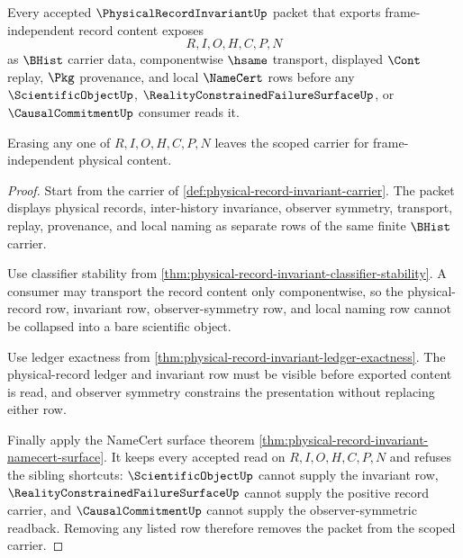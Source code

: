 \begin{theorem}
\label{thm:physical-record-invariant-kernel-scope}
Every accepted $\PhysicalRecordInvariantUp$ packet that exports frame-independent record content exposes
$$
R,I,O,H,C,P,N
$$
as $\BHist$ carrier data, componentwise $\hsame$ transport, displayed $\Cont$ replay, $\Pkg$ provenance, and local $\NameCert$ rows before any $\ScientificObjectUp$, $\RealityConstrainedFailureSurfaceUp$, or $\CausalCommitmentUp$ consumer reads it.

Erasing any one of $R,I,O,H,C,P,N$ leaves the scoped carrier for frame-independent physical content.
\end{theorem}
\begin{proof}
Start from the carrier of \autoref{def:physical-record-invariant-carrier}. The packet displays physical records, inter-history invariance, observer symmetry, transport, replay, provenance, and local naming as separate rows of the same finite $\BHist$ carrier.

Use classifier stability from \autoref{thm:physical-record-invariant-classifier-stability}. A consumer may transport the record content only componentwise, so the physical-record row, invariant row, observer-symmetry row, and local naming row cannot be collapsed into a bare scientific object.

Use ledger exactness from \autoref{thm:physical-record-invariant-ledger-exactness}. The physical-record ledger and invariant row must be visible before exported content is read, and observer symmetry constrains the presentation without replacing either row.

Finally apply the NameCert surface theorem \autoref{thm:physical-record-invariant-namecert-surface}. It keeps every accepted read on $R,I,O,H,C,P,N$ and refuses the sibling shortcuts: $\ScientificObjectUp$ cannot supply the invariant row, $\RealityConstrainedFailureSurfaceUp$ cannot supply the positive record carrier, and $\CausalCommitmentUp$ cannot supply the observer-symmetric readback. Removing any listed row therefore removes the packet from the scoped carrier.
\end{proof}

